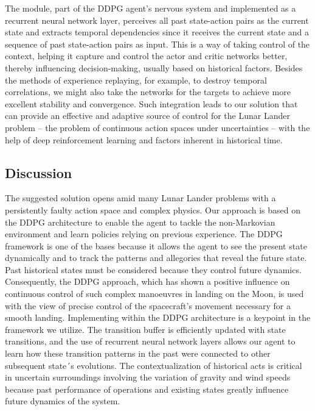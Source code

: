 \documentclass[conference]{IEEEtran}
\begin{document}
The module, part of the DDPG agent's nervous system and implemented as a recurrent neural network layer, perceives all past state-action pairs as the current state and extracts temporal dependencies since it receives the current state and a sequence of past state-action pairs as input. This is a way of taking control of the context, helping it capture and control the actor and critic networks better, thereby influencing decision-making, usually based on historical factors. Besides the methods of experience replaying, for example, to destroy temporal correlations, we might also take the networks for the targets to achieve more excellent stability and convergence. Such integration leads to our solution that can provide an effective and adaptive source of control for the Lunar Lander problem – the problem of continuous action spaces under uncertainties – with the help of deep reinforcement learning and factors inherent in historical time.

\subsection{Discussion}

The suggested solution opens amid many Lunar Lander problems with a persistently faulty action space and complex physics. Our approach is based on the DDPG architecture to enable the agent to tackle the non-Markovian environment and learn policies relying on previous experience. The DDPG framework is one of the bases because it allows the agent to see the present state dynamically and to track the patterns and allegories that reveal the future state. Past historical states must be considered because they control future dynamics. Consequently, the DDPG approach, which has shown a positive influence on continuous control of such complex manoeuvres in landing on the Moon, is used with the view of precise control of the spacecraft's movement necessary for a smooth landing\cite{guttulsrud2023solving}. 
Implementing within the DDPG architecture is a keypoint in the framework we utilize. The transition buffer is efficiently updated with state transitions, and the use of recurrent neural network layers allows our agent to learn how these transition patterns in the past were connected to other subsequent state´s evolutions\cite{goudarzi2021distributed}. The contextualization of historical acts is critical in uncertain surroundings involving the variation of gravity and wind speeds because past performance of operations and existing states greatly influence future dynamics of the system.
\end{document}
